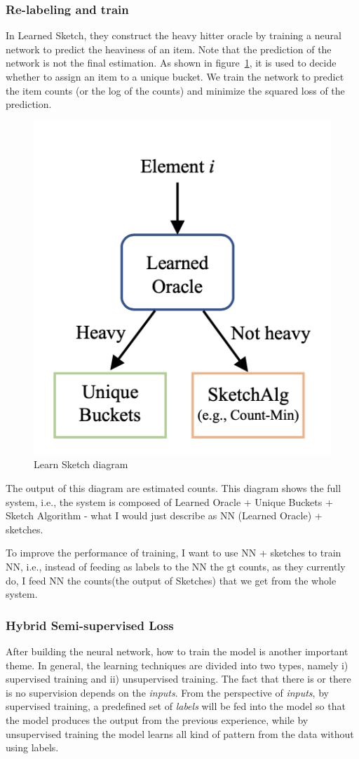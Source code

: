 \subsubsection{Re-labeling and train}
In Learned Sketch, they construct the heavy hitter oracle by training a neural network to predict the heaviness of an item. Note that the prediction of the network is not the final estimation. As shown in figure~\ref{fig:NN+Sketch}, it is used to decide whether to assign an item to a unique bucket. We train the network to predict the item counts (or the log of the counts) and minimize the squared loss of the prediction.

\begin{figure}[htbp!]
	\centering
	\includegraphics[width=0.5\linewidth]{images/plots/NN_Sketch.png}
	\caption{Learn Sketch diagram}
	\label{fig:NN+Sketch}
\end{figure}

The output of this diagram are estimated counts. This diagram shows the full system, i.e., the system is composed of Learned Oracle + Unique Buckets + Sketch Algorithm - what I would just describe as NN (Learned Oracle) + sketches.

To improve the performance of training, I want to use NN + sketches to train NN, i.e., instead of feeding as labels to the NN the gt counts, as they currently do, I feed NN the counts(the output of Sketches) that we get from the whole system.

\subsubsection{Hybrid Semi-supervised Loss}
After building the neural network, how to train the model is another important theme. In general, the learning techniques are divided into two types, namely i) supervised training and ii) unsupervised training.  The fact that there is or there is no supervision depends on the \emph{inputs}.
From the perspective of \emph{inputs}, by supervised training, a predefined set of \emph{labels} will be fed into the model so that the model produces the output from the previous experience, while by unsupervised training the model learns all kind of pattern from the data without using labels. 

